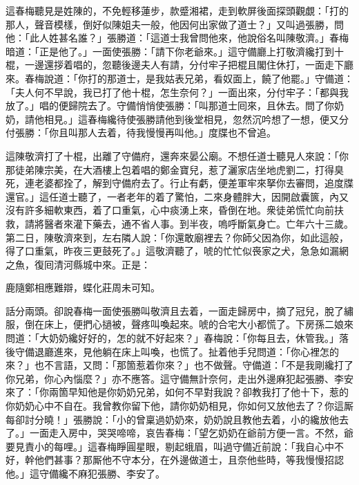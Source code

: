 這春梅聽見是姓陳的，{}不免輕移蓮步，款蹙湘裙，走到軟屏後面探頭觀覷：「打的那人，聲音模樣，倒好似陳姐夫一般，他因何出家做了道士？」又叫過張勝，問他：「此人姓甚名誰？」張勝道：「這道士我曾問他來，他說俗名叫陳敬濟。」春梅暗道：「正是他了。」{}一面使張勝：「請下你老爺來。」這守備廳上打敬濟纔打到十棍，一邊還拶着唱的，忽聽後邊夫人有請，分付牢子把棍且閣住休打，一面走下廳來。春梅說道：「你打的那道士，是我姑表兄弟，看奴面上，饒了他罷。」守備道：「夫人何不早說，我已打了他十棍，怎生奈何？」一面出來，分付牢子：「都與我放了。」唱的便歸院去了。守備悄悄使張勝：「叫那道士囘來，且休去。問了你奶奶，請他相見。」這春梅纔待使張勝請他到後堂相見，忽然沉吟想了一想，便又分付張勝：「你且叫那人去着，待我慢慢再叫他。」{}度牒也不曾追。

這陳敬濟打了十棍，出離了守備府，還奔來晏公廟。不想任道士聽見人來說：「你那徒弟陳宗美，在大酒樓上包着唱的鄭金寶兒，惹了灑家店坐地虎劉二，打得臭死，連老婆都拴了，解到守備府去了。行止有虧，便差軍牢來拏你去審問，追度牒還官。」這任道士聽了，一者老年的着了驚怕，二來身體胖大，因開啟囊篋，內又沒有許多細軟東西，着了口重氣，心中痰湧上來，昏倒在地。衆徒弟慌忙向前扶救，請將醫者來灌下藥去，通不省人事。到半夜，嗚呼斷氣身亡。亡年六十三歲。{}第二日，陳敬濟來到，左右隣人說：「你還敢廟裡去？你師父因為你，如此這般，得了口重氣，昨夜三更鼓死了。」這敬濟聽了，唬的忙忙似䘮家之犬，急急如漏網之魚，復囘清河縣城中來。正是：

鹿隨鄭相應難辯，蝶化莊周未可知。

話分兩頭。卻說春梅一面使張勝叫敬濟且去着，一面走歸房中，摘了冠兒，脫了繡服，倒在床上，便捫心撾被，聲疼叫喚起來。{}唬的合宅大小都慌了。下房孫二娘來問道：「大奶奶纔好好的，怎的就不好起來？」春梅說：「你每且去，休管我。」落後守備退廳進來，見他躺在床上叫喚，也慌了。扯着他手兒問道：「你心裡怎的來？」也不言語，又問：「那箇惹着你來？」也不做聲。守備道：「不是我剛纔打了你兄弟，你心內惱麼？」亦不應答。{}這守備無計奈何，走出外邊麻犯起張勝、李安來了：「你兩箇早知他是你奶奶兄弟，如何不早對我說？卻教我打了他十下，惹的你奶奶心中不自在。我曾教你留下他，請你奶奶相見，你如何又放他去了？你這厮每卻討分曉！」張勝說：「小的曾稟過奶奶來，奶奶說且教他去着，小的纔放他去了。」一面走入房中，哭哭啼啼，哀告春梅：「望乞奶奶在爺前方便一言。不然，爺要見責小的每哩。」這春梅睜圓星眼，剔起蛾眉，叫過守備近前說：「我自心中不好，幹他們甚事？那厮他不守本分，在外邊做道士，且奈他些時，等我慢慢招認他。」{}這守備纔不麻犯張勝、李安了。

